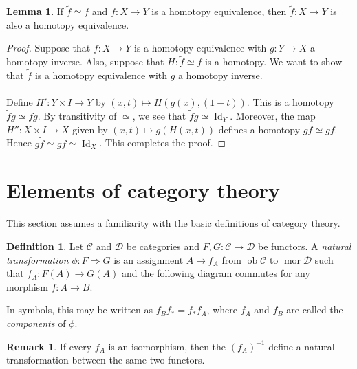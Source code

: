 \documentclass[10pt,letterpaper,cm]{nupset}
\theoremstyle{definition}
\newtheorem*{definition}{Definition}
\newtheorem{remark}{Remark}
\newtheorem{lemma}{Lemma}
\newcommand{\1}{\mathbf{1}}
\renewcommand{\c}{\mathscr{C}}
\renewcommand{\d}{\mathscr{D}}
\newcommand{\0}{\vec 0}
\DeclareMathOperator{\id}{Id}
\DeclareMathOperator{\ob}{ob}
\DeclareMathOperator{\mor}{mor}
\begin{document}
\begin{lemma}
If $\tilde{f} \simeq f$ and $f: X \to Y$ is a homotopy equivalence, then $\tilde{f} : X \to Y$ is also a homotopy equivalence.
\end{lemma}
\begin{proof}
Suppose that $f: X \to Y$ is a homotopy equivalence with $g: Y \to X$ a homotopy inverse. Also, suppose that $H: \tilde{f} \simeq f$ is a homotopy. We want to show that $\tilde{f}$ is a homotopy equivalence with $g$ a homotopy inverse. 
\\ \\ Define $H' : Y \times I \to Y$ by $(x,t) \mapsto H(g(x), (1-t))$. This is a homotopy $\tilde{f} g \simeq f g$. By transitivity of $\simeq$, we see that $\tilde{f} g  \simeq \id_Y$. Moreover, the map $H'' : X \times I \to X$ given by $(x,t) \mapsto g(H(x,t))$ defines a homotopy $g \tilde{f} \simeq gf$. Hence $g\tilde{f} \simeq gf \simeq \id_X$. This completes the proof.
\end{proof}

\section{Elements of category theory}

This section assumes a familiarity with the basic definitions of category theory.

\begin{definition}
Let $\c$ and $\d$ be categories and $F,G: \c \to \d$ be functors.  A \textit{natural transformation} $\phi :F \Rightarrow G$  is an assignment  $A \mapsto f_A$ from $\ob \c$ to $\mor \d$ such that $f_A : F(A) \to G(A)$ and the following diagram commutes for any morphism $f: A \to B$.

\begin{center}
\end{center}
In symbols, this may be written as $f_Bf_{\ast} = f_{\ast}f_A$, where $f_A$ and $f_B$ are called the \textit{components} of $\phi$.
\end{definition}

\begin{remark}
If every $f_A$ is an isomorphism, then the $(f_A)^{-1}$ define a natural transformation between the same two functors.
\end{remark}
\end{document}
